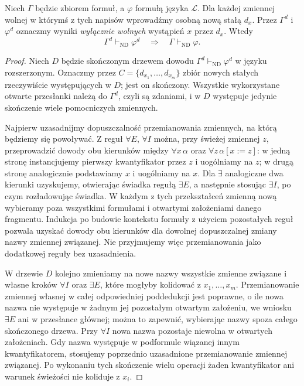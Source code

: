 \begin{lemat}\label{lem:henkin-parameters}
Niech $\Gamma$ będzie zbiorem formuł, a $\varphi$ formułą języka $\mathcal L$. Dla każdej zmiennej wolnej w którymś z tych napisów wprowadźmy osobną nową stałą $d_x$. Przez $\Gamma^d$ i $\varphi^d$ oznaczmy wyniki \emph{wyłącznie wolnych} wystąpień $x$ przez $d_x$. Wtedy
\[
\Gamma^d\vdash_{\mathrm{ND}}\varphi^d
\quad\Longrightarrow\quad
\Gamma\vdash_{\mathrm{ND}}\varphi.
\]
\end{lemat}
\begin{proof}
Niech $D$ będzie skończonym drzewem dowodu $\Gamma^d\vdash_{\mathrm{ND}}\varphi^d$ w języku rozszerzonym. Oznaczmy przez $C=\{d_{x_1},\ldots,d_{x_m}\}$ zbiór nowych stałych rzeczywiście występujących w $D$; jest on skończony. Wszystkie wykorzystane otwarte przesłanki należą do $\Gamma^d$, czyli są zdaniami, i w $D$ występuje jedynie skończenie wiele pomocniczych zmiennych.

Najpierw uzasadnijmy dopuszczalność przemianowania zmiennych, na którą będziemy się powoływać. Z reguł $\forall E$, $\forall I$ można, przy świeżej zmiennej $z$, przeprowadzić dowody obu kierunków między $\forall x\,\alpha$ oraz $\forall z\,\alpha[x:=z]$: w jedną stronę instancjujemy pierwszy kwantyfikator przez $z$ i uogólniamy na $z$; w drugą stronę analogicznie podstawiamy $x$ i uogólniamy na $x$. Dla $\exists$ analogiczne dwa kierunki uzyskujemy, otwierając świadka regułą $\exists E$, a następnie stosując $\exists I$, po czym rozładowując świadka. W każdym z tych przekształceń zmienną nową wybieramy poza wszystkimi formułami i otwartymi założeniami danego fragmentu. Indukcja po budowie kontekstu formuły z użyciem pozostałych reguł pozwala uzyskać dowody obu kierunków dla dowolnej dopuszczalnej zmiany nazwy zmiennej związanej. Nie przyjmujemy więc przemianowania jako dodatkowej reguły bez uzasadnienia.

W drzewie $D$ kolejno zmieniamy na nowe nazwy wszystkie zmienne związane i własne kroków $\forall I$ oraz $\exists E$, które mogłyby kolidować z $x_1,\ldots,x_m$. Przemianowanie zmiennej własnej w całej odpowiedniej poddedukcji jest poprawne, o ile nowa nazwa nie występuje w żadnym jej pozostałym otwartym założeniu, we wniosku $\exists E$ ani w przesłance głównej; można to zapewnić, wybierając nazwy spoza całego skończonego drzewa. Przy $\forall I$ nowa nazwa pozostaje niewolna w otwartych założeniach. Gdy nazwa występuje w podformule wiązanej innym kwantyfikatorem, stosujemy poprzednio uzasadnione przemianowanie zmiennej związanej. Po wykonaniu tych skończenie wielu operacji żaden kwantyfikator ani warunek świeżości nie koliduje z $x_i$.


\end{proof}
